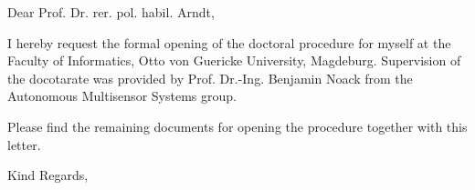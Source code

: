 \documentclass{letter}
\date{}
\begin{document}
\begin{letter}{}

\opening{Dear Prof. Dr. rer. pol. habil. Arndt,}
I hereby request the formal opening of the doctoral procedure for myself at the Faculty of Informatics, Otto von Guericke University, Magdeburg. Supervision of the docotarate was provided by Prof. Dr.-Ing. Benjamin Noack from the Autonomous Multisensor Systems group.

Please find the remaining documents for opening the procedure together with this letter.
\closing{Kind Regards,}

\end{letter}
\end{document}
